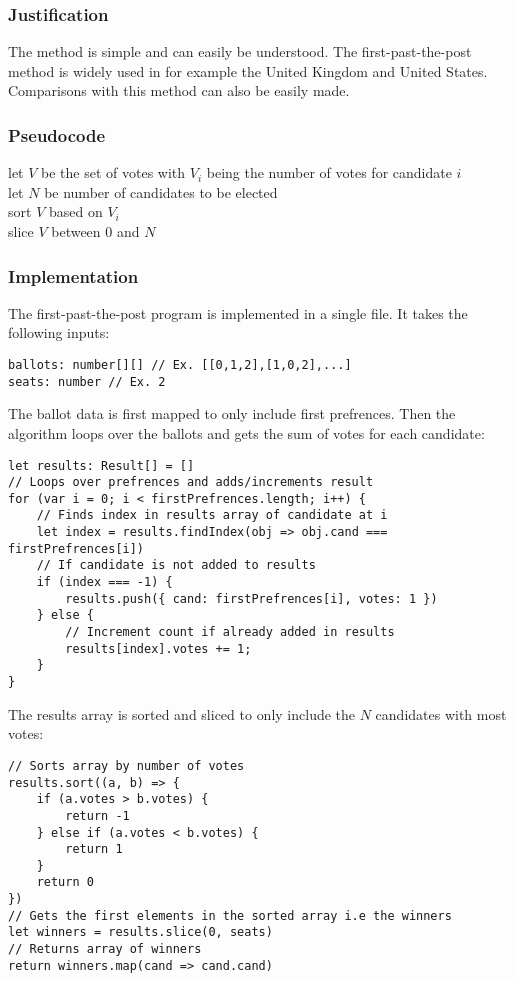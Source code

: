 \subsubsection{Justification}
The method is simple and can easily be understood. The first-past-the-post method is widely used in for example the United Kingdom and United States. Comparisons with this method can also be easily made.
\subsubsection{Pseudocode}
let $V$ be the set of votes with $V_{i}$ being the number of votes for candidate $i$ \\
let $N$ be number of candidates to be elected \\
sort $V$ based on $V_{i}$\\
slice $V$ between $0$ and $N$
\subsubsection{Implementation}
The first-past-the-post program is implemented in a single file. It takes the following inputs:
\begin{lstlisting}
ballots: number[][] // Ex. [[0,1,2],[1,0,2],...]
seats: number // Ex. 2
\end{lstlisting}
The ballot data is first mapped to only include first prefrences. Then the algorithm loops over the ballots and gets the sum of votes for each candidate:
\begin{lstlisting}
let results: Result[] = []
// Loops over prefrences and adds/increments result
for (var i = 0; i < firstPrefrences.length; i++) {
    // Finds index in results array of candidate at i
    let index = results.findIndex(obj => obj.cand === firstPrefrences[i])
    // If candidate is not added to results
    if (index === -1) {
        results.push({ cand: firstPrefrences[i], votes: 1 })
    } else {
        // Increment count if already added in results
        results[index].votes += 1;
    }
}
\end{lstlisting}
The results array is sorted and sliced to only include the $N$ candidates with most votes:
\begin{lstlisting}
// Sorts array by number of votes
results.sort((a, b) => {
    if (a.votes > b.votes) {
        return -1
    } else if (a.votes < b.votes) {
        return 1
    }
    return 0
})
// Gets the first elements in the sorted array i.e the winners
let winners = results.slice(0, seats)
// Returns array of winners
return winners.map(cand => cand.cand)
\end{lstlisting}
